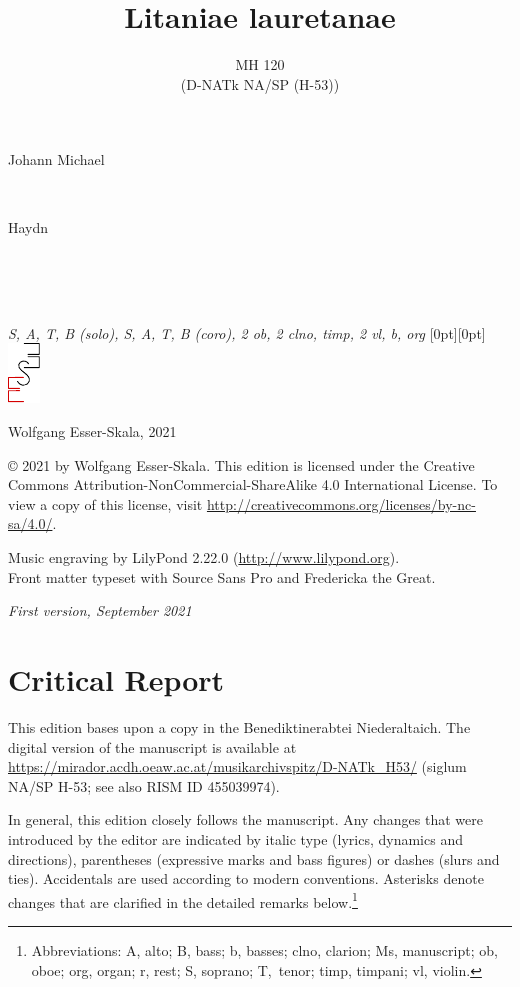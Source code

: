 \documentclass[parskip=full]{scrreprt}
\makeatletter
\DeclareRobustCommand{\sbseries}{\fontseries{sb}\selectfont}
\newcommand\fancytitlehead{
  \headingfont%
  \fontsize{80}{80}\selectfont%
  \textcolor{black!80}{%
    \makebox[0pt][l]{\@ifundefined{@shortname}{\@lastname}{\@shortname}.}%
  }\\[15pt]%
  \fontsize{60}{60}\selectfont%
  \makebox[0pt][l]{\@ifundefined{@shorttitle}{\@title}{\@shorttitle}.}%
}
\def\firstname#1{\def\@firstname{#1}}
\def\lastname#1{\def\@lastname{#1}}
\def\shortname#1{\def\@shortname{#1}}
\def\shorttitle#1{\def\@shorttitle{#1}}
\def\scoring#1{\def\@scoring{#1}}
\def\maketitle{%
\begin{titlepage}%
  \Large%
  {\@titlehead}%
  \vfill%
  {\strut\@firstname}\\%
  {\sbseries\color{oldred}\strut\@lastname}\\%
  {\strut\@namesuffix}%
  \vfill%
  {\sbseries\@title}\\%
  {\@subtitle}\\[\baselineskip]%
  {\itshape\@scoring}%
  \vfill%
  {\itshape\@parts}\hspace*{\fill}\raisebox{0pt}[0pt][0pt]{\includegraphics{ees_logo}}%
\end{titlepage}%
}
\newif\ifprintreport\printreportfalse
\makeatother
\begin{document}
\frenchspacing

\titlehead{\fancytitlehead}
\firstname{Johann Michael}
\lastname{Haydn}
\shortname{M. Haydn}
\title{Litaniae lauretanae}
\shorttitle{Lit. lauretanae}
\subtitle{MH 120\\(D-NATk NA/SP (H-53))}
\scoring{S, A, T, B (solo), S, A, T, B (coro), 2 ob, 2 clno, timp, 2 vl, b, org}
\maketitle


\thispagestyle{empty}

\vspace*{\fill}

\hspace*{1em}Wolfgang Esser-Skala, 2021

© 2021 by Wolfgang Esser-Skala. This edition is licensed under the Creative Commons Attribution-NonCommercial-ShareAlike 4.0 International License. To view a copy of this license, visit \url{http://creativecommons.org/licenses/by-nc-sa/4.0/}.

Music engraving by LilyPond 2.22.0 (\url{http://www.lilypond.org}).\\
Front matter typeset with Source Sans Pro and Fredericka the Great.

\textit{First version, September 2021}

\vspace*{2cm}

\ifprintreport
\chapter*{Critical Report}

This edition bases upon a copy in the Benediktinerabtei Niederaltaich. The digital version of the manuscript is available at \url{https://mirador.acdh.oeaw.ac.at/musikarchivspitz/D-NATk_H53/} (siglum NA/SP H-53; see also RISM ID 455039974).

In general, this edition closely follows the manuscript. Any changes that were introduced by the editor are indicated by italic type (lyrics, dynamics and directions), parentheses (expressive marks and bass figures) or dashes (slurs and ties). Accidentals are used according to modern conventions. Asterisks denote changes that are clarified in the detailed remarks below.\footnote{Abbreviations: A, alto; B, bass; b, basses; clno, clarion; Ms, manuscript; ob, oboe; org, organ; r, rest; S, soprano; T,~tenor; timp, timpani; vl, violin.}
\end{document}

